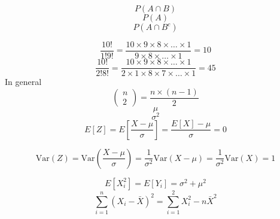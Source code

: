 \documentclass[aspectratio=169]{beamer}
\newcommand{\Var}{\mathrm{Var}}
\begin{document}
\begin{frame}
$$
P(A\cap B)
$$
$$
P(A)
$$
$$
P(A\cap B^c)
$$
\end{frame}

\begin{frame}
$$
\frac{10!}{1!9!} = \frac{10\times 9 \times 8 \times \ldots \times 1}{9 \times 8 \times \ldots \times 1} = 10
$$
$$
\frac{10!}{2!8!} = \frac{10\times 9 \times 8 \times \ldots \times 1}{2 \times 1 \times 8 \times 7 \times \ldots \times 1} = 45
$$
In general
$$
\left(
\begin{array}{c}
n \\ 2
\end{array}
\right)
= 
\frac{n \times (n - 1)}{2}
$$
$$
\mu 
$$
$$
\sigma^2
$$
$$
E[Z] = E\left[\frac{X - \mu}{\sigma} \right] = \frac{E[X] - \mu}{\sigma}  = 0
$$
\end{frame}

\begin{frame}
$$
\Var(Z) = \Var\left(\frac{X - \mu}{\sigma}\right) = \frac{1}{\sigma^2} \Var(X - \mu) = \frac{1}{\sigma^2} \Var(X) = 1
$$
\end{frame}

\begin{frame}
$$
E[X_i^2] = E[Y_i] = \sigma^2 + \mu^2
$$
$$
\sum_{i=1}^n (X_i - \bar X)^2 = \sum_{i=1}^2 X_i^2 - n \bar X ^ 2 
$$
\end{frame}
\end{document}
